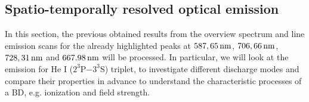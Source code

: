 \documentclass[a4paper,10pt,twoside]{article}
\begin{document}
		
		
		
		
		
		\subsection{Spatio-temporally resolved optical emission}\label{subsec:stroe}
		
			In this section, the previous obtained results from the overview spectrum and line emission scans for the already highlighted peaks at $\unit[587,65]{nm}$, $\unit[706,66]{nm}$, $\unit[728,31]{nm}$ and $\unit[667.98]{nm}$ will be processed. In particular, we will look at the emission for He I ($2^3$P$-3^3$S) triplet, to investigate different discharge modes and compare their properties in advance to understand the characteristic processes of a BD, e.g. ionization and field strength.
\end{document}
